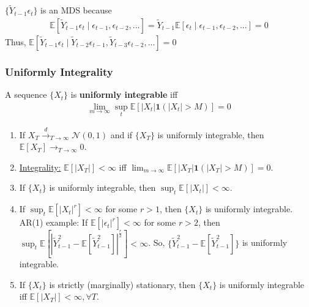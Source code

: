 \documentclass[11pt]{elegantbook}
\begin{document}
\begin{remark}
\begin{example}
        $\{\tilde{Y}_{t-1}\epsilon_t\}$ is an MDS because
        \begin{equation}
            \begin{aligned}
                \mathbb{E}[\tilde{Y}_{t-1}\epsilon_t\mid \epsilon_{t-1},\epsilon_{t-2},...]=\tilde{Y}_{t-1}\mathbb{E}[\epsilon_t\mid \epsilon_{t-1},\epsilon_{t-2},...]=0
            \end{aligned}
            \nonumber
        \end{equation}
        Thus, $\mathbb{E}[\tilde{Y}_{t-1}\epsilon_t\mid \tilde{Y}_{t-2}\epsilon_{t-1},\tilde{Y}_{t-3}\epsilon_{t-2},...]=0$
    \end{example}
\end{remark}
\subsubsection*{Uniformly Integrality}
\begin{definition}
    A sequence $\{X_t\}$ is \textbf{uniformly integrable} iff
    \begin{equation}
        \begin{aligned}
            \lim_{m \rightarrow \infty}\sup_t \mathbb{E}\left[|X_t|\mathbf{1}\left(|X_t|>M\right)\right]=0
        \end{aligned}
        \nonumber
    \end{equation}
\end{definition}
\begin{remark}
    \begin{enumerate}
        \item If $X_T \stackrel{d}{\longrightarrow}_{T \rightarrow \infty} \mathcal{N}\left(0,1\right)$ and if $\{X_T\}$ is uniformly integrable, then $\mathbb{E}[X_T] \rightarrow_{T \rightarrow \infty} 0$.
        \item \underline{Integrality:} $\mathbb{E}[|X_T|]<\infty$ iff $\lim_{m \rightarrow \infty}\mathbb{E}\left[|X_T|\mathbf{1}\left(|X_T|>M\right)\right]=0$.
        \item If $\{X_t\}$ is uniformly integrable, then $\sup_t \mathbb{E}[|X_t|]<\infty$.
        \item If $\sup_t \mathbb{E}[|X_t|^r]<\infty$ for some $r>1$, then $\{X_t\}$ is uniformly integrable.
        \subitem AR(1) example: If $\mathbb{E}[|\epsilon_t|^r]<\infty$ for some $r>2$, then $\sup_t \mathbb{E}[|\tilde{Y}_{t-1}^2-\mathbb{E}[\tilde{Y}_{t-1}^2]|^\frac{r}{2}]<\infty$. So, $\{\tilde{Y}_{t-1}^2-\mathbb{E}[\tilde{Y}_{t-1}^2]\}$ is uniformly integrable.
        \item If $\{X_t\}$ is strictly (marginally) stationary, then $\{X_t\}$ is uniformly integrable iff $\mathbb{E}[|X_T|]<\infty,\forall T$.
    \end{enumerate}
\end{remark}
\end{document}
